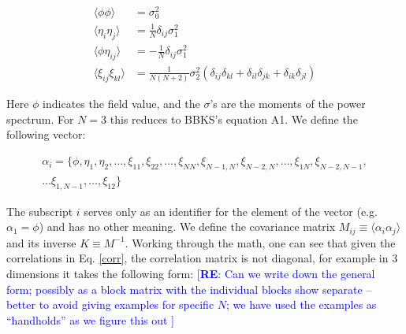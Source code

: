 \documentclass[12pt]{article}
\newcommand{\re}[1]{\textcolor{blue}{[{\bf RE}: #1]}}
\begin{document}
\begin{equation} \label{corr}
\begin{split}
\langle\phi\phi\rangle &= \sigma_0^2 \\
\langle\eta_i\eta_j\rangle &= \frac{1}{N}\delta_{ij}\sigma_1^2 \\
\langle\phi\eta_{ij}\rangle &= -\frac{1}{N}\delta_{ij}\sigma_1^2 \\
\langle\xi_{ij}\xi_{kl}\rangle &= \frac{1}{N(N+2)}\sigma_2^2(\delta_{ij}\delta_{kl}+\delta_{il}\delta_{jk}+\delta_{ik}\delta_{jl})
\end{split}
\end{equation}

\noindent Here $\phi$ indicates the field value, and the $\sigma$'s are the moments of the power spectrum. For $N=3$ this reduces to BBKS's equation A1. We define the following vector:

\begin{equation}
\begin{split}
\alpha_i = \{\phi,\eta_1,\eta_2,\ldots,\xi_{11},\xi_{22},\ldots,\xi_{NN},\xi_{N-1,N},\xi_{N-2,N},\ldots,\xi_{1N},\xi_{N-2,N-1},\\
\ldots\xi_{1,N-1},\ldots,\xi_{12}\}
\end{split}
\end{equation}

\noindent The subscript $i$ serves only as an identifier for the element of the vector (e.g. $\alpha_1 = \phi$) and has no other meaning. We define the covariance matrix $M_{ij}\equiv\langle\alpha_i\alpha_j\rangle$ and its inverse $K \equiv M^{-1}$. Working through the math, one can see that given the correlations in Eq. \ref{corr}, the correlation matrix is not diagonal, for example in 3 dimensions it takes the following form: \re{Can we write down the general form; possibly as a block matrix with the individual blocks show separate -- better to avoid giving examples for specific $N$; we have used the examples as ``handholds'' as we figure this out }
\end{document}
